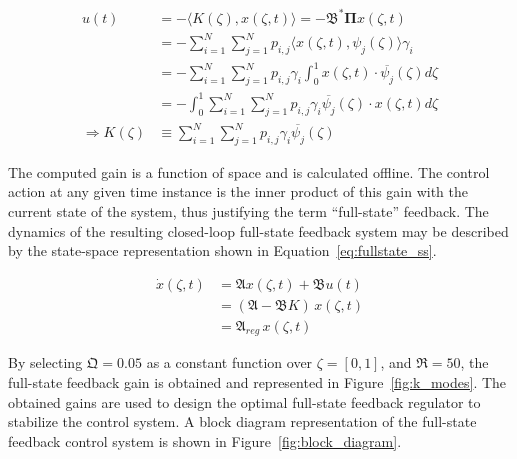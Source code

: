\begin{equation} \label{eq:fullstate_gain}
    \begin{aligned}
        u(t) &= - \langle K(\zeta), x(\zeta, t) \rangle = - \mathfrak{B}^* \mathbf{\Pi} x(\zeta, t) \\
        &= - \sum_{i=1}^N\sum_{j=1}^N p_{i,j} \langle x(\zeta, t), \psi_j(\zeta) \rangle \gamma_i \\
        &= - \sum_{i=1}^N\sum_{j=1}^N p_{i,j} \gamma_i \int_0^1 x(\zeta, t) \cdot \overline{\psi_j}(\zeta) d\zeta \\
        &= - \int_0^1 \sum_{i=1}^N\sum_{j=1}^N p_{i,j} \gamma_i \overline{\psi_j}(\zeta) \cdot x(\zeta, t) d\zeta \\
        \Rightarrow K(\zeta) &\equiv \sum_{i=1}^N\sum_{j=1}^N p_{i,j} \gamma_i \overline{\psi_j}(\zeta)
    \end{aligned}
\end{equation}

The computed gain is a function of space and is calculated offline. The control action at any given time instance is the inner product of this gain with the current state of the system, thus justifying the term ``full-state'' feedback. The dynamics of the resulting closed-loop full-state feedback system may be described by the state-space representation shown in Equation~\ref{eq:fullstate_ss}.

\begin{equation}
    \begin{aligned} \label{eq:fullstate_ss}
        \dot{x}(\zeta, t) &= \mathfrak{A} x(\zeta, t) + \mathfrak{B} u(t) \\
        &= (\mathfrak{A} - \mathfrak{B} K) \, x(\zeta, t) \\
        &= \mathfrak{A}_{reg} \, x(\zeta, t)
    \end{aligned}
\end{equation}

By selecting $\mathfrak{Q} = 0.05$ as a constant function over $\zeta = [0,1]$, and $\mathfrak{R} = 50$, the full-state feedback gain is obtained and represented in Figure~\ref{fig:k_modes}. The obtained gains are used to design the optimal full-state feedback regulator to stabilize the control system. A block diagram representation of the full-state feedback control system is shown in Figure~\ref{fig:block_diagram}.

